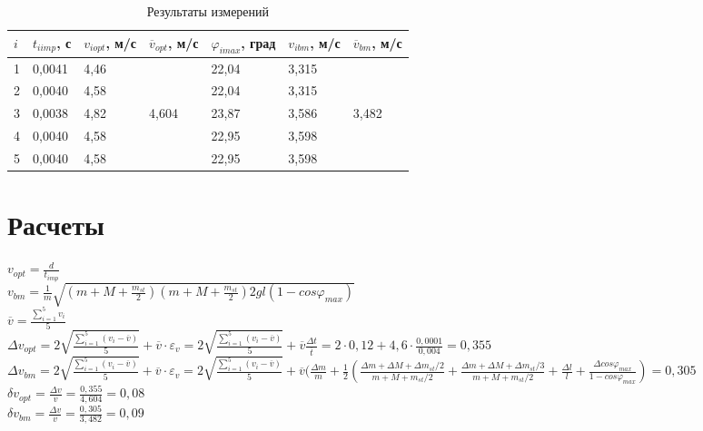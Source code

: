 \documentclass[12pt]{article}
\begin{document}
	\begin{table}[H]
		\begin{tabular}{|l|l|l|l|l|l|l|}
			\hline
			$i$ & $t_{i imp}$, с & $v_{i opt}$, м/с & $\overline{v}_{opt}$, м/с & $\varphi_{i max}$, град & $v_{i bm}$, м/с & $\overline{v}_{bm}$, м/с \\ \hline
			1   & 0,0041         & 4,46             &                           & 22,04               & 3,315              &                          \\ \cline{1-3} \cline{5-6}
			2   & 0,0040         & 4,58             &                           & 22,04               & 3,315              &                          \\ \cline{1-3} \cline{5-6}
			3   & 0,0038         & 4,82             & 4,604                     & 23,87               & 3,586              & 3,482                    \\ \cline{1-3} \cline{5-6}
			4   & 0,0040         & 4,58             &                           & 22,95               & 3,598              &                          \\ \cline{1-3} \cline{5-6}
			5   & 0,0040         & 4,58             &                           & 22,95               & 3,598              &                          \\ \hline
		\end{tabular}
		\caption{Результаты измерений}
	\end{table}
	\section{Расчеты}
	$v_{opt}=\frac{d}{t_{imp}}$\\
	$v_{bm}=\frac{1}{m}\sqrt{(m+M+\frac{m_{st}}{2})(m+M+\frac{m_{st}}{2})2gl(1-cos\varphi_{max})}$\\
	$\overline{v}=\frac{\sum\limits_{i=1}^{5}v_i}{5}$\\
	$\Delta v_{opt}=2\sqrt{\frac{\sum\limits_{i=1}^5(v_i-\overline{v})}{5}}+\overline{v}\cdot\varepsilon_v=2\sqrt{\frac{\sum\limits_{i=1}^5(v_i-\overline{v})}{5}}+\overline{v}\frac{\Delta t}{\overline{t}}=2\cdot0{,}12+4{,}6\cdot\frac{0{,}0001}{0{,}004}=0{,}355$\\
	$\Delta v_{bm}=2\sqrt{\frac{\sum\limits_{i=1}^5(v_i-\overline{v})}{5}}+\overline{v}\cdot\varepsilon_v=2\sqrt{\frac{\sum\limits_{i=1}^5(v_i-\overline{v})}{5}}+\overline{v}(\frac{\Delta m}{m}+\frac{1}{2}(\frac{\Delta m+\Delta M+\Delta m_{st}/2}{m+M+m_{st}/2}+\frac{\Delta m+\Delta M+\Delta m_{st}/3}{m+M+m_{st}/2}+\frac{\Delta l}{l}+\frac{\Delta cos\varphi_{max}}{1-cos\varphi_{max}})=0{,}305$\\
	$\delta v_{opt}=\frac{\Delta v}{v}=\frac{0{,}355}{4,604}=0{,}08$\\
	$\delta v_{bm}=\frac{\Delta v}{v}=\frac{0{,}305}{3{,}482}=0{,}09$\\
\end{document}
